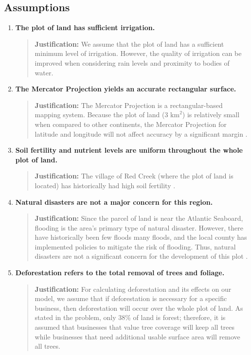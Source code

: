 \documentclass{mcmthesis}
\begin{document}
\subsection {Assumptions}
\begin{enumerate} 
    \item \textbf{The plot of land has sufficient irrigation. }
    \begin{quote}
        \textbf{Justification:} We assume that the plot of land has a sufficient minimum level of irrigation. However, the quality of irrigation can be improved when considering rain levels and proximity to bodies of water.
    \end{quote}
    
      \item \textbf{The Mercator Projection yields an accurate rectangular surface.}
    \begin{quote}
        \textbf{Justification:} The Mercator Projection is a rectangular-based mapping system. Because the plot of land (3 $\text{km}^2$) is relatively small when compared to other continents, the Mercator Projection for latitude and longitude will not affect accuracy by a significant margin \cite{the_editors_of_the_encyclopaedia_britannica_mercator_nodate}.
    \end{quote}
    
    \item\textbf{Soil fertility and nutrient levels are uniform throughout the whole plot of land.}
    \begin{quote}
    \textbf{Justification:} The village of Red Creek (where the plot of land is located) has historically had high soil fertility \cite{noauthor_red_2022} \cite{noauthor_wayne_2017} \cite{noauthor_wayne_2015}.
    \end{quote}
    
  \item \textbf{Natural disasters are not a major concern for this region.}
    \begin{quote}
    \textbf{Justification:} Since the parcel of land is near the Atlantic Seaboard, flooding is the area's primary type of natural disaster. However, there have historically been few floods many floods, and the local county has implemented policies to mitigate the risk of flooding. Thus, natural disasters are not a significant concern for the development of this plot \cite{noauthor_wayne_2017} \cite{young_strategies_inc_visit_2015}. 
    \end{quote}
    
     \item \textbf{Deforestation refers to the total removal of trees and foliage.}
    \begin{quote}
        \textbf{Justification:} For calculating deforestation and its effects on our model, we assume that if deforestation is necessary for a specific business, then deforestation will occur over the whole plot of land. As stated in the problem, only 38\% of land is forest; therefore, it is assumed that businesses that value tree coverage will keep all trees while businesses that need additional usable surface area will remove all trees. 
    \end{quote}


\end{enumerate}
\end{document}
